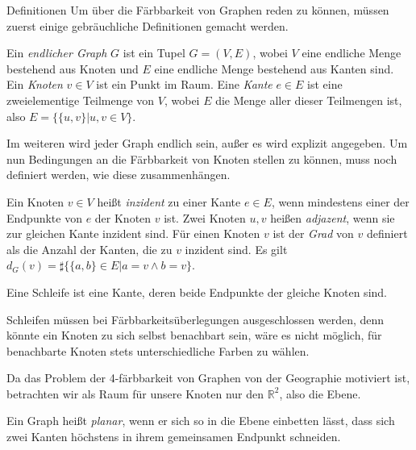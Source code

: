 \begin{chapter}{Definitionen}
  Um über die Färbbarkeit von Graphen reden zu können, müssen zuerst einige gebräuchliche Definitionen gemacht werden. 
  \begin{definition}
   Ein \textit{endlicher Graph} $G$ ist ein Tupel $G=(V,E)$, wobei $V$ eine endliche Menge bestehend aus Knoten und $E$ eine endliche Menge bestehend aus Kanten sind. Ein \textit{Knoten} $v \in V$ ist ein Punkt im Raum. Eine \textit{Kante} $e \in E$ ist eine zweielementige Teilmenge von $V$, wobei $E$ die Menge aller dieser Teilmengen ist, also $E = \{\{u,v\}|u,v \in V\}$.
  \end{definition}
  
  Im weiteren wird jeder Graph endlich sein, außer es wird explizit angegeben. Um nun Bedingungen an die Färbbarkeit von Knoten stellen zu können, muss noch definiert werden, wie diese zusammenhängen.
  
  \begin{definition}
   Ein Knoten $v \in V$ heißt \textit{inzident} zu einer Kante $e \in E$, wenn mindestens einer der Endpunkte von $e$ der Knoten $v$ ist. Zwei Knoten $u,v$ heißen \textit{adjazent}, wenn sie zur gleichen Kante inzident sind. Für einen Knoten $v$ ist der \textit{Grad} von $v$ definiert als die Anzahl der Kanten, die zu $v$ inzident sind. Es gilt $d_G(v) = \sharp\{\{a,b\} \in E | a=v \wedge b=v \}$.
  \end{definition}
  
  \begin{definition}[Schleife]
   Eine Schleife ist eine Kante, deren beide Endpunkte der gleiche Knoten sind.
  \end{definition}
  Schleifen müssen bei Färbbarkeitsüberlegungen ausgeschlossen werden, denn könnte ein Knoten zu sich selbst benachbart sein, wäre es nicht möglich, für benachbarte Knoten stets unterschiedliche Farben zu wählen.
  
  Da das Problem der 4-färbbarkeit von Graphen von der Geographie motiviert ist, betrachten wir als Raum für unsere Knoten nur den $\mathbb{R}^2$, also die Ebene.
  
  \begin{definition}[Planarität]
   Ein Graph heißt \textit{planar}, wenn er sich so in die Ebene einbetten lässt, dass sich zwei Kanten höchstens in ihrem gemeinsamen Endpunkt schneiden.
  \end{definition}


\end{chapter}
